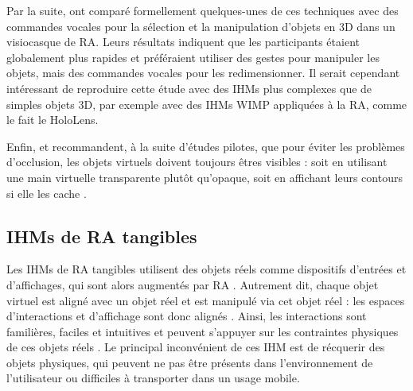 
Par la suite, \cite{Piumsomboon2014} ont comparé formellement quelques-unes de ces techniques avec des commandes vocales pour la sélection et la manipulation d'objets en 3D dans un visiocasque de RA. Leurs résultats indiquent que les participants étaient globalement plus rapides et préféraient utiliser des gestes pour manipuler les objets, mais des commandes vocales pour les redimensionner. Il serait cependant intéressant de reproduire cette étude avec des IHMs plus complexes que de simples objets 3D, par exemple avec des IHMs WIMP appliquées à la RA, comme le fait le HoloLens.


Enfin, \cite{Piumsomboon2013} et \cite{Piumsomboon2014} recommandent, à la suite d'études pilotes, que pour éviter les problèmes d'occlusion, les objets virtuels doivent toujours êtres visibles : soit en utilisant une main virtuelle transparente plutôt qu'opaque, soit en affichant leurs contours si elle les cache .

\subsection{IHMs de RA tangibles}
\label{subsec:litterature_ar_hci_tui}
Les IHMs de RA tangibles utilisent des objets réels comme dispositifs d'entrées et d'affichages, qui sont alors augmentés par RA \citep{Kato2000}. Autrement dit, chaque objet virtuel est aligné avec un objet réel et est manipulé via cet objet réel \citep{Billinghurst2005} : les espaces d'interactions et d'affichage sont donc alignés \citep[p. 170]{Billinghurst2015}. Ainsi, les interactions sont familières, faciles et intuitives et peuvent s'appuyer sur les contraintes physiques de ces objets réels \citep{Zhou2008}. Le principal inconvénient de ces IHM est de récquerir des objets physiques, qui peuvent ne pas être présents dans l'environnement de l'utilisateur ou difficiles à transporter dans un usage mobile.

